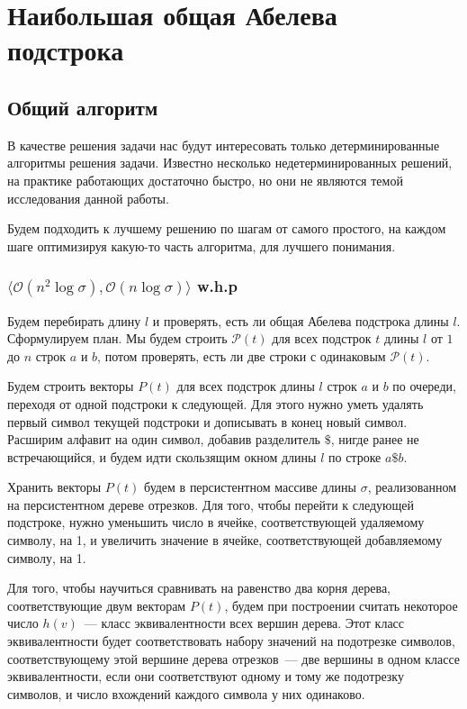 \section{Наибольшая общая Абелева подстрока}

\subsection{Общий алгоритм}

В качестве решения задачи нас будут интересовать только детерминированные алгоритмы решения задачи. Известно несколько недетерминированных решений, на практике работающих достаточно быстро, но они не являются темой исследования данной работы.

Будем подходить к лучшему решению по шагам от самого простого, на каждом шаге оптимизируя какую-то часть алгоритма, для лучшего понимания.

\subsubsection{$\langle \mathcal{O}(n^2 \log \sigma), \mathcal{O}(n \log \sigma) \rangle$ w.h.p}

Будем перебирать длину $l$ и проверять, есть ли общая Абелева подстрока длины $l$.
Сформулируем план. Мы будем строить $\mathcal{P}(t)$ для всех подстрок $t$ длины $l$ от $1$ до $n$ строк $a$ и $b$, потом проверять, есть ли две строки с одинаковым $\mathcal{P}(t)$.

Будем строить векторы $P(t)$ для всех подстрок длины $l$ строк $a$ и $b$ по очереди, переходя от одной подстроки к следующей. Для этого нужно уметь удалять первый символ текущей подстроки и дописывать в конец новый символ. Расширим алфавит на один символ, добавив разделитель $\$$, нигде ранее не встречающийся, и будем идти скользящим окном длины $l$ по строке $a\$b$.

Хранить векторы $P(t)$ будем в персистентном массиве длины $\sigma$, реализованном на персистентном дереве отрезков. Для того, чтобы перейти к следующей подстроке, нужно уменьшить число в ячейке, соответствующей удаляемому символу, на 1, и увеличить значение в ячейке, соответствующей добавляемому символу, на 1.

Для того, чтобы научиться сравнивать на равенство два корня дерева, соответствующие двум векторам $P(t)$, будем при построении считать некоторое число $h(v)$~--- класс эквивалентности всех вершин дерева. Этот класс эквивалентности будет соответствовать набору значений на подотрезке символов, соответствующему этой вершине дерева отрезков~--- две вершины в одном классе эквивалентности, если они соответствуют одному и тому же подотрезку символов, и число вхождений каждого символа у них одинаково.


